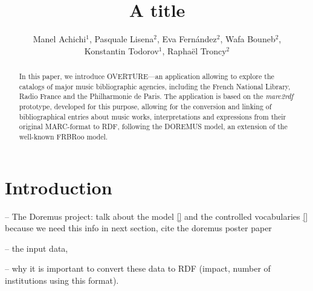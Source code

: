 \documentclass[runningheads,a4paper]{llncs}
\begin{document}
\title{A title}

% 


\author{Manel Achichi$^1$, Pasquale Lisena$^2$, Eva Fern\'{a}ndez$^2$, Wafa Bouneb$^2$, \\ Konstantin Todorov$^1$, Rapha\"{e}l Troncy$^2$}

\maketitle


\begin{abstract}
In this paper, we introduce OVERTURE---an application allowing to explore the catalogs of major music bibliographic agencies, including the French National Library, Radio France and the Philharmonie de Paris. The application is based on the {\it marc2rdf} prototype, developed for this purpose, allowing for the conversion and linking of bibliographical entries about music works, interpretations and expressions from their original MARC-format to RDF, following the DOREMUS model, an extension of the well-known FRBRoo model.
\end{abstract}


\section{Introduction}
\label{sec:introduction}

-- The Doremus project: talk about the model \ref{} and the controlled vocabularies \ref{} because we need this info in next section, cite the doremus poster paper \cite{achichi2015doremus}

-- the input data,

-- why it is important to convert these data to RDF (impact, number of institutions using this format).

\end{document}
